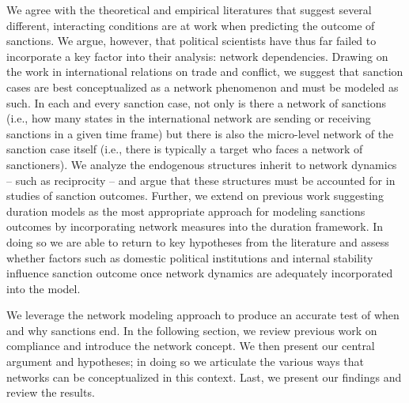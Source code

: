 We agree with the theoretical and empirical literatures that suggest several different, interacting conditions are at work when predicting the outcome of sanctions. We argue, however, that political scientists have thus far failed to incorporate a key factor into their analysis: network dependencies. Drawing on the work in international relations on trade and conflict, we suggest that sanction cases are best conceptualized as a network phenomenon and must be modeled as such. In each and every sanction case, not only is there a network of sanctions (i.e., how many states in the international network are sending or receiving sanctions in a given time frame) but there is also the micro-level network of the sanction case itself (i.e., there is typically a target who faces a network of sanctioners). We analyze the endogenous structures inherit to network dynamics -- such as reciprocity -- and argue that these structures must be accounted for in studies of sanction outcomes. Further, we extend on previous work suggesting duration models as the most appropriate approach for modeling sanctions outcomes by incorporating network measures into the duration framework. In doing so we are able to return to key hypotheses from the literature and assess whether factors such as domestic political institutions and internal stability influence sanction outcome once network dynamics are adequately incorporated into the model. 

We leverage the network modeling approach to produce an accurate test of when and why sanctions end. In the following section, we review previous work on compliance and introduce the network concept. We then present our central argument and hypotheses; in doing so we articulate the various ways that networks can be conceptualized in this context. Last, we present our findings and review the results.

